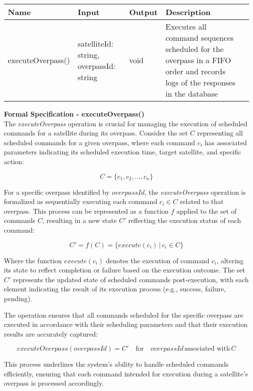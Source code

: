 \documentclass[12pt, titlepage]{article}
\begin{document}
\begin{center}
\begin{tabular}{|p{3.2cm} |p{3cm} | p{1.3cm} |p{5cm} |p{4cm}|}
\hline
\textbf{Name} & \textbf{Input} & \textbf{Output} & \textbf{Description} \\
\hline
executeOverpass() & satelliteId: string, overpassId: string & void & Executes all command sequences scheduled for the overpass in a FIFO order and records logs of the responses in the database \\
\hline
\end{tabular}
\end{center}

\textbf{Formal Specification - executeOverpass()} \\
The \textit{executeOverpass} operation is crucial for managing the execution of scheduled commands for a satellite during its overpass. Consider the set $C$ representing all scheduled commands for a given overpass, where each command $c_i$ has associated parameters indicating its scheduled execution time, target satellite, and specific action:

\[
C = \{c_1, c_2, \ldots, c_n\}
\]

For a specific overpass identified by $overpassId$, the \textit{executeOverpass} operation is formalized as sequentially executing each command $c_i \in C$ related to that overpass. This process can be represented as a function $f$ applied to the set of commands $C$, resulting in a new state $C'$ reflecting the execution status of each command:

\[
C' = f(C) = \{execute(c_i) \, | \, c_i \in C\}
\]

Where the function $execute(c_i)$ denotes the execution of command $c_i$, altering its state to reflect completion or failure based on the execution outcome. The set $C'$ represents the updated state of scheduled commands post-execution, with each element indicating the result of its execution process (e.g., success, failure, pending).

The operation ensures that all commands scheduled for the specific overpass are executed in accordance with their scheduling parameters and that their execution results are accurately captured:

\[
executeOverpass(overpassId) = C' \quad \text{for} \quad overpassId \, \text{associated with} \, C
\]

This process underlines the system's ability to handle scheduled commands efficiently, ensuring that each command intended for execution during a satellite's overpass is processed accordingly.
\end{document}
